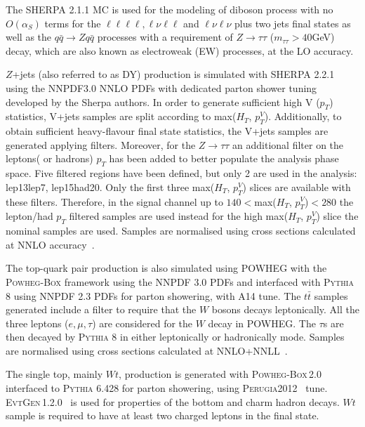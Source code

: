 The \textsc{SHERPA} 2.1.1 MC is used for the modeling of diboson process with no $O(\alpha_S)$ terms for the $\ell\ell\ell\ell, \ell\nu\ell\ell$ and $\ell\nu\ell\nu$ plus two jets final states as well as the $q\bar{q}{\to}Zq\bar{q}$ processes with a requirement of $Z{\to}\tau\tau$ ($m_{\tau\tau} > 40$GeV) decay, which are also known as electroweak (EW) processes, at the LO accuracy.

$Z$+jets (also referred to as DY) production is simulated with \textsc{SHERPA} 2.2.1 using the NNPDF3.0 NNLO PDFs with dedicated parton shower tuning developed by the Sherpa authors. 
In order to generate sufficient high V ($p_T$) statistics, V+jets samples are split according to max($H_T$, $p_T^V$). 
Additionally, to obtain sufficient heavy-flavour final state statistics, the V+jets samples are generated applying filters.
Moreover, for the $Z \to \tau \tau$ an additional filter on the leptons( or hadrons) $p_T$ has been added to better populate the analysis phase space.
Five filtered regions have been defined, but only 2 are used in the analysis: lep13lep7, lep15had20.
Only the first three max($H_T$, $p_T^V$) slices are available with these filters.
Therefore, in the signal channel up to $140<$max($H_T$, $p_T^V$)$<280$ the lepton/had $p_T$ filtered samples are used instead for the high max($H_T$, $p_T^V$) slice the nominal samples are used.
Samples are normalised using cross sections calculated at NNLO accuracy~\cite{MelnikovPetriello}.

The top-quark pair production is also simulated using \textsc{POWHEG} with the \textsc{ Powheg-Box} framework using the NNPDF 3.0 PDFs and interfaced with \textsc{Pythia 8} using NNPDF 2.3 PDFs for parton showering, with A14 tune.
The $t\bar{t}$ samples generated include a filter to require that the $W$ bosons decays leptonically. All the three leptons ($e, \mu, \tau$) are considered for the $W$ decay in \textsc{POWHEG}. The $\tau$s are then decayed by \textsc{Pythia 8} in either leptonically or hadronically mode.
Samples are normalised using cross sections calculated at NNLO+NNLL~\cite{Czakon:2013}.

The single top, mainly $Wt$, production is generated with
\textsc{Powheg-Box}\,2.0 interfaced to \textsc{Pythia} 6.428 for parton showering, using \textsc{Perugia}2012~\cite{Skands:2010ak} tune.
\textsc{ EvtGen}\,1.2.0~\cite{Lange:2001uf} is used for properties of the bottom and charm hadron decays.
$Wt$ sample is required to have at least two charged leptons in the final state.

